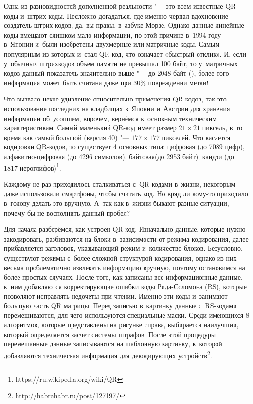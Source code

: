 \documentclass[final,pdftex]{../../template/epsilonj}
\begin{document}
Одна из разновидностей дополненной реальности "--- это всем известные QR-коды и~штрих коды. Несложно догадаться, где именно черпал вдохновение создатель штрих кодов, да, вы правы, в~азбуке Морзе. Однако данные линейные коды вмещают слишком мало информации, по этой причине в~1994 году в~Японии и~были изобретены двухмерные или матричные коды. Самым популярным из которых и~стал QR-код, что означает «быстрый отклик». И, если у~обычных штрихкодов объем памяти не превышал 100 байт, то у~матричных кодов данный показатель значительно выше "--- до 2048 байт (\cite{WikiDataMatrixRu}), более того информация может быть считана даже при 30\% повреждении метки! 

Что вызвало некое удивление относительно применения QR-кодов, так это использование последних на кладбищах в~Японии и~Австрии для хранения информации об~усопшем, впрочем, вернёмся к~основным техническим характеристикам. Самый маленький QR-код имеет размер $21\times21$ пиксель, в~то время как самый большой (версия 40) "--- $177\times177$ пикселей. Что касается кодировки QR-кодов, то существует 4 основных типа: цифровая (до 7089 цифр), алфавитно-цифровая (до 4296 символов), байтовая(до 2953 байт), кандзи (до 1817 иероглифов)\footnote{https://ru.wikipedia.org/wiki/QR}.

Каждому не раз приходилось сталкиваться с~QR-кодами в~жизни, некоторым даже использовали смартфоны, чтобы считать код. Но вряд ли кому-то приходило в~голову делать это вручную. А~так как в~жизни бывают разные ситуации, почему бы не восполнить данный пробел?

Для начала разберёмся, как устроен QR-код. Изначально данные, которые нужно закодировать, разбиваются на блоки в~зависимости от режима кодирования, далее прибавляется заголовок, указывающий режим и~количество блоков. Безусловно, существуют режимы с~более сложной структурой кодирования, однако из них весьма проблематично извлекать информацию вручную, поэтому остановимся на более простых случаях. После того, как записаны все информационные данные, к~ним добавляются корректирующие ошибки коды Рида-Соломона (RS), которые позволяют исправлять недочеты при чтении. Именно эти коды и~занимают большую часть QR матрицы. Перед записью в~картинку данные с~RS-кодами перемешиваются, для чего используются специальные маски. Среди имеющихся 8 алгоритмов, которые представлены на рисунке справа, выбирается наилучший, который определяется засчет системы штрафов. После этой процедуры перемешанные данные записываются на шаблонную картинку, к~которой добавляются техническая информация для декодирующих устройств\footnote{http://habrahabr.ru/post/127197/}.
\end{document}
